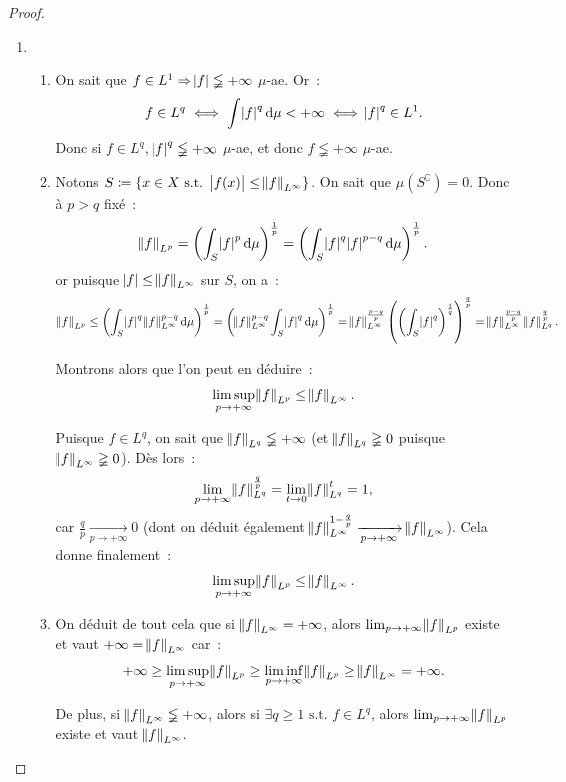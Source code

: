 \documentclass{article}
\newcommand{\pinfty}{{+\infty}}
\newcommand{\st}{\text{ s.t. }}
\newcommand{\C}{\complement}
\begin{document}
\begin{proof}
\begin{enumerate}
	{\small {}}

	\item~
	\begin{enumerate}
		\item On sait que $f \in L^1 \Rightarrow \abs f \lneqq \pinfty$ $\mu$-ae. Or~:
		\[f \in L^q \iff \int \abs f^q\dif\mu < \pinfty \iff \abs f^q \in L^1.\]
		Donc si $f \in L^q$, $\abs f^q \lneqq \pinfty$ $\mu$-ae, et donc $f \lneqq \pinfty$ $\mu$-ae.

		\item Notons $S \coloneqq \{x \in X \st \abs {f(x)} \leq \norm f_{L^\infty}\}$. On sait que $\mu(S^\C) = 0$. Donc à $p > q$ fixé~:
		\[\norm f_{L^p} = \left(\int_S \abs f^p\dif\mu\right)^{\frac 1p} = \left(\int_S \abs f^q\abs f^{p-q}\dif\mu\right)^{\frac 1p}.\]
		or puisque $\abs f \leq \norm f_{L^\infty}$ sur $S$, on a~:
		\[\norm f_{L^p} \leq \left(\int_S\abs f^q\norm f_{L^\infty}^{p-q}\dif\mu\right)^{\frac 1p} = \left(\norm f_{L^\infty}^{p-q}\int_S\abs f^q\dif\mu\right)^{\frac 1p}
		= \norm f_{L^\infty}^{\frac {p-q}p}\left(\left(\int_S \abs f^q\right)^{\frac 1q}\right)^{\frac qp} = \norm f_{L^\infty}^{\frac {p-q}p}\norm f_{L^q}^{\frac qp}.\]

		Montrons alors que l'on peut en déduire~:
		\[\limsup_{p \to \pinfty}\norm f_{L^p} \leq \norm f_{L^\infty}.\]

		Puisque $f \in L^q$, on sait que $\norm f_{L^q} \lneqq \pinfty$ (et $\norm f_{L^q} \gneqq 0$ puisque $\norm f_{L^\infty} \gneqq 0$). Dès lors~:
		\[\lim_{p \to \pinfty}\norm f_{L^q}^{\frac qp} = \lim_{t \to 0}\norm f_{L^q}^t = 1,\]
		car $\frac qp \xrightarrow[p \to \pinfty]{} 0$ (dont on déduit également $\norm f_{L^\infty}^{1-\frac qp} \xrightarrow[p \to \pinfty]{} \norm f_{L^\infty}$). Cela donne
		finalement~:
		\[\limsup_{p \to \pinfty}\norm f_{L^p} \leq \norm f_{L^\infty}.\]

		\item On déduit de tout cela que si $\norm f_{L^\infty} = \pinfty$, alors $\lim_{p \to \pinfty}\norm f_{L^p}$ existe et vaut $\pinfty = \norm f_{L^\infty}$ car~:
		\[\pinfty \geq \limsup_{p \to \pinfty}\norm f_{L^p} \geq \liminf_{p \to \pinfty}\norm f_{L^p} \geq \norm f_{L^\infty} = \pinfty.\]


		De plus, si $\norm f_{L^\infty} \lneqq \pinfty$, alors si $\exists q \geq 1 \st f \in L^q$, alors $\lim_{p \to \pinfty} \norm f_{L^p}$ existe et vaut $\norm f_{L^\infty}$.

		\end{enumerate}
\end{enumerate}
\end{proof}
\end{document}
